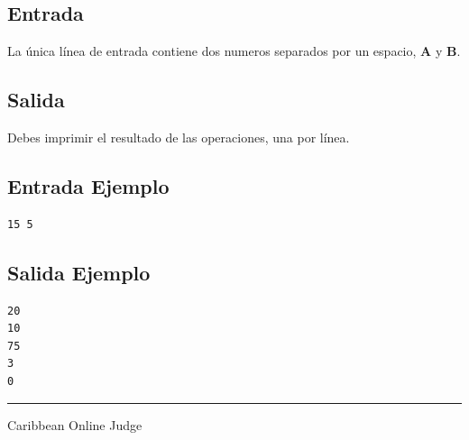 \documentclass[letter,10pt]{article}
\newcommand{\lyxaddress}[1]{
\par {\raggedright #1
\vspace{1.4em}
\noindent\par}
}
\begin{document}
\subsection*{Entrada}

La única línea de entrada contiene dos numeros separados por un espacio, \textbf{A} y \textbf{B}.

\subsection*{Salida}

Debes imprimir el resultado de las operaciones, una por línea.

\subsection*{Entrada Ejemplo}
\begin{verbatim}
15 5
\end{verbatim}

\subsection*{Salida Ejemplo}

\begin{verbatim}
20
10
75
3
0
\end{verbatim}

\noindent \rule[0.5ex]{1\columnwidth}{1pt}


\lyxaddress{Caribbean Online Judge}
\end{document}
